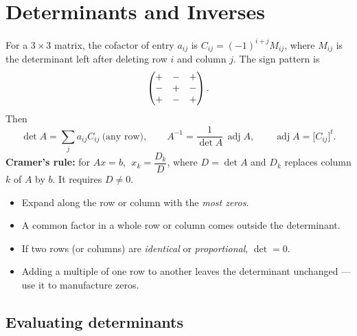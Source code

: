 \chapter{Determinants and Inverses}


\begin{keyidea}
For a $3\times3$ matrix, the cofactor of entry $a_{ij}$ is
$C_{ij}=(-1)^{i+j}M_{ij}$, where $M_{ij}$ is the determinant left after
deleting row $i$ and column $j$. The sign pattern is
\[
\begin{pmatrix}+&-&+\\-&+&-\\+&-&+\end{pmatrix}.
\]
Then
\[
\det A=\sum_j a_{ij}C_{ij}\ \text{(any row)},\qquad
A^{-1}=\frac{1}{\det A}\,\operatorname{adj}A,\qquad
\operatorname{adj}A=\bigl[C_{ij}\bigr]^{t}.
\]
\textbf{Cramer's rule:} for $Ax=b$, $\;x_k=\dfrac{D_k}{D}$, where $D=\det A$ and
$D_k$ replaces column $k$ of $A$ by $b$. It requires $D\neq0$.
\end{keyidea}

\begin{keyidea}
\begin{itemize}
  \item Expand along the row or column with the \emph{most zeros}.
  \item A common factor in a whole row or column comes outside the determinant.
  \item If two rows (or columns) are \emph{identical} or \emph{proportional},
        $\det=0$.
  \item Adding a multiple of one row to another leaves the determinant
        unchanged --- use it to manufacture zeros.
\end{itemize}
\end{keyidea}

\section{Evaluating determinants}

